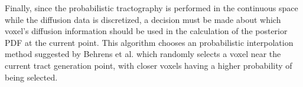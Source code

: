 Finally, since the probabilistic tractography is performed in the continuous space while the diffusion data is discretized, a decision must be made about which voxel's diffusion information should be used in the calculation of the posterior PDF at the current point.  This algorithm chooses an probabilistic interpolation method suggested by Behrens et al. \cite{behrensMRM03} which randomly selects a voxel near the current tract generation point, with closer voxels having a higher probability of being selected.





